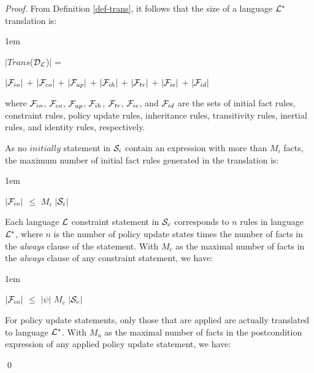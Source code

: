 \documentclass[global,twocolumn,final]{svjour}
\newenvironment{vproof}
  {\begin{proof}\hspace{0.25em}}
  {\qed\end{proof}}
\newenvironment{vquote}
  {\begin{list}{}{\leftmargin 1em}\item[]}
  {\end{list}}
\begin{document}
        \begin{vproof}
          From Definition \ref{def-trans}, it follows that the size of a
          language ${\cal L}^{*}$ translation is:

          \begin{vquote}
            $|$$Trans$(${\cal D_{L}}$)$|$ =

            \hspace{1em}
            $|{\cal F}_{in}|$ $+$
            $|{\cal F}_{co}|$ $+$
            $|{\cal F}_{up}|$ $+$
            $|{\cal F}_{ih}|$ $+$
            $|{\cal F}_{tr}|$ $+$
            $|{\cal F}_{ie}|$ $+$
            $|{\cal F}_{id}|$
          \end{vquote}

          where ${\cal F}_{in}$, ${\cal F}_{co}$, ${\cal F}_{up}$,
          ${\cal F}_{ih}$, ${\cal F}_{tr}$, ${\cal F}_{ie}$, and
          ${\cal F}_{id}$ are the sets of initial fact rules, constraint rules,
          policy update rules, inheritance rules, transitivity rules,
          inertial rules, and identity rules, respectively.

          As no $initially$ statement in ${\cal S}_{i}$ contain an expression
          with more than $M_{i}$ facts, the maximum number of initial fact
          rules generated in the translation is:

          \begin{vquote}
            $|{\cal F}_{in}|$ $\leq$ $M_{i}$ $|$${\cal S}_{i}$$|$
          \end{vquote}

          Each language ${\cal L}$ constraint statement in ${\cal S}_{c}$
          corresponds to $n$ rules in language ${\cal L}^{*}$, where $n$ is
          the number of policy update states times the number of facts in the
          {\em always} clause of the statement. With $M_{c}$ as the maximal
          number of facts in the {\em always} clause of any constraint
          statement, we have:

          \begin{vquote}
            $|{\cal F}_{co}|$ $\leq$ $|\psi|$ $M_{c}$ $|$${\cal S}_{c}$$|$
          \end{vquote}

          For policy update statements, only those that are applied are
          actually translated to language ${\cal L}^{*}$. With $M_{u}$ as the
          maximal number of facts in the postcondition expression of any
          applied policy update statement, we have:


\end{vproof}
\end{document}

